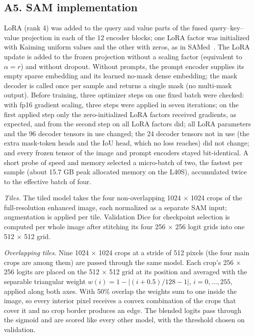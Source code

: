\subsection*{A5. SAM implementation}
LoRA (rank 4) was added to the query and value parts of the fused query--key--value projection in each of the 12 encoder
blocks; one LoRA factor was initialized with Kaiming uniform values and the other with zeros, as in
SAMed~\cite{zhang2023samed}. The LoRA update is added to the frozen projection without a scaling factor (equivalent to
$\alpha = r$) and without dropout. Without prompts, the prompt encoder supplies its empty sparse embedding and its learned
no-mask dense embedding; the mask decoder is called once per sample and returns a single mask (no multi-mask output). Before
training, three optimizer steps on one fixed batch were checked: with fp16 gradient scaling, three steps were applied in
seven iterations; on the first applied step only the zero-initialized LoRA factors received gradients, as expected, and from
the second step on all LoRA factors did; all LoRA parameters and the
96 decoder tensors in use changed; the 24 decoder tensors not in use (the extra mask-token heads and the IoU head, which no
loss reaches) did not change; and every frozen tensor of the image and prompt encoders stayed bit-identical. A short probe of
speed and memory selected a micro-batch of two, the fastest per sample (about 15.7 GB peak allocated memory on the L40S),
accumulated twice to the effective batch of four.

\emph{Tiles.} The tiled model takes the four non-overlapping 1024 $\times$ 1024 crops of the full-resolution enhanced image,
each normalized as a separate SAM input; augmentation is applied per tile. Validation Dice for checkpoint selection is
computed per whole image after stitching its four 256 $\times$ 256 logit grids into one 512 $\times$ 512 grid.

\emph{Overlapping tiles.} Nine 1024 $\times$ 1024 crops at a stride of 512 pixels (the four main crops are among them) are
passed through the same model. Each crop's 256 $\times$ 256 logits are placed on the 512 $\times$ 512 grid at its position
and averaged with the separable triangular weight $w(i) = 1 - \lvert (i + 0.5)/128 - 1 \rvert$, $i = 0, \dots, 255$,
applied along both axes. With 50\% overlap the weights sum to one inside the image, so every interior pixel receives a
convex combination of the crops that cover it and no crop border produces an edge. The blended logits pass through the
sigmoid and are scored like every other model, with the threshold chosen on validation.

